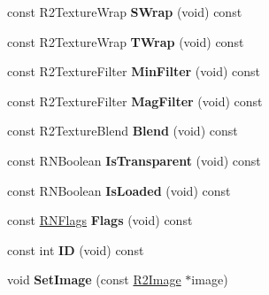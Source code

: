 \begin{DoxyCompactItemize}
\item 
const R2\+Texture\+Wrap {\bfseries S\+Wrap} (void) const \hypertarget{class_r2_texture_a162db0fa79e5158ab4aec75926585fc9}{}\label{class_r2_texture_a162db0fa79e5158ab4aec75926585fc9}

\item 
const R2\+Texture\+Wrap {\bfseries T\+Wrap} (void) const \hypertarget{class_r2_texture_a906d713825c171372c546925e0f8d241}{}\label{class_r2_texture_a906d713825c171372c546925e0f8d241}

\item 
const R2\+Texture\+Filter {\bfseries Min\+Filter} (void) const \hypertarget{class_r2_texture_a9b5fcf65df338ddfde5d99c9580b158a}{}\label{class_r2_texture_a9b5fcf65df338ddfde5d99c9580b158a}

\item 
const R2\+Texture\+Filter {\bfseries Mag\+Filter} (void) const \hypertarget{class_r2_texture_a39fae65a85f544284812b8204a0ae505}{}\label{class_r2_texture_a39fae65a85f544284812b8204a0ae505}

\item 
const R2\+Texture\+Blend {\bfseries Blend} (void) const \hypertarget{class_r2_texture_a6fb54dd13e6e4bd49a071c9f36bae03a}{}\label{class_r2_texture_a6fb54dd13e6e4bd49a071c9f36bae03a}

\item 
const R\+N\+Boolean {\bfseries Is\+Transparent} (void) const \hypertarget{class_r2_texture_a6f0774412a87f8a0747a13c9417b4fb8}{}\label{class_r2_texture_a6f0774412a87f8a0747a13c9417b4fb8}

\item 
const R\+N\+Boolean {\bfseries Is\+Loaded} (void) const \hypertarget{class_r2_texture_a3b6963f2fae27baed735d5df8e570ca1}{}\label{class_r2_texture_a3b6963f2fae27baed735d5df8e570ca1}

\item 
const \hyperlink{class_r_n_flags}{R\+N\+Flags} {\bfseries Flags} (void) const \hypertarget{class_r2_texture_a3798e0fabbd81f81cd4915a6cc65261e}{}\label{class_r2_texture_a3798e0fabbd81f81cd4915a6cc65261e}

\item 
const int {\bfseries ID} (void) const \hypertarget{class_r2_texture_a065bf34d710f168009fbb9dd73be5ac8}{}\label{class_r2_texture_a065bf34d710f168009fbb9dd73be5ac8}

\item 
void {\bfseries Set\+Image} (const \hyperlink{class_r2_image}{R2\+Image} $\ast$image)\hypertarget{class_r2_texture_a25168ce976af52de3ff33aefd923d5e0}{}\label{class_r2_texture_a25168ce976af52de3ff33aefd923d5e0}


\end{DoxyCompactItemize}
